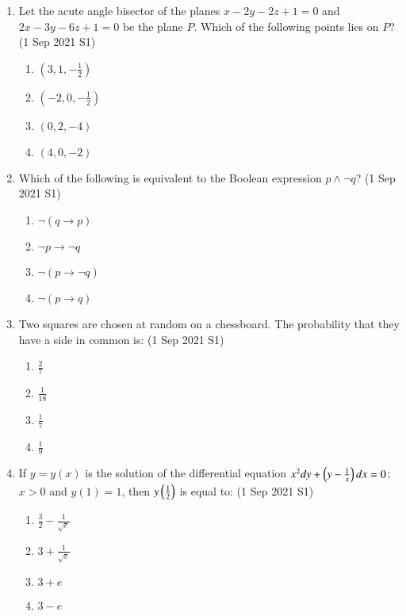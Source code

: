 \documentclass[journal]{IEEEtran}
\begin{document}
\begin{enumerate}
    \item Let the acute angle bisector of the planes $x - 2y - 2z + 1 = 0$ and $2x - 3y - 6z + 1 = 0$ be the plane $P$. Which of the following points lies on $P$? \hfill (1 Sep 2021 S1)
    \begin{multicols}{2}
        \begin{enumerate}
            \item $(3, 1, -\frac{1}{2})$
            \item $(-2, 0, -\frac{1}{2})$
            \item $(0, 2, -4)$
            \item $(4, 0, -2)$
        \end{enumerate}
    \end{multicols}

    \item Which of the following is equivalent to the Boolean expression $p \land \neg q$? \hfill (1 Sep 2021 S1)
    \begin{multicols}{4}
        \begin{enumerate}
            \item $\neg(q \to p)$
            \item $\neg p \to \neg q$
            \item $\neg(p \to \neg q)$
            \item $\neg(p \to q)$
        \end{enumerate}
    \end{multicols}
    
    \item Two squares are chosen at random on a chessboard. The probability that they have a side in common is: \hfill (1 Sep 2021 S1)
    \begin{multicols}{4}
        \begin{enumerate}
            \item $\frac{2}{7}$
            \item $\frac{1}{18}$
            \item $\frac{1}{7}$
            \item $\frac{1}{9}$
        \end{enumerate}
    \end{multicols}

    \item If $y = y(x)$ is the solution of the differential equation $x^2 dy + \left(y - \frac{1}{x}\right) dx = 0$; $x > 0$ and $y(1) = 1$, then $y\left(\frac{1}{2}\right)$ is equal to: \hfill (1 Sep 2021 S1)
    \begin{multicols}{4}
        \begin{enumerate}
            \item $\frac{3}{2} - \frac{1}{\sqrt{e}}$
            \item $3 + \frac{1}{\sqrt{e}}$
            \item $3 + e$
            \item $3 - e$
        \end{enumerate}
    \end{multicols}


\end{enumerate}
\end{document}
